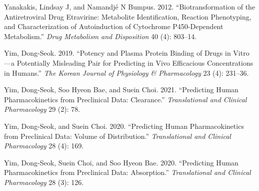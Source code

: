 \documentclass[
  11pt,
  krantz2, a4paper, twoside]{krantz}
\newlength{\cslhangindent}
\newlength{\cslentryspacingunit} %
\newenvironment{CSLReferences}[2] %
 {%
  \setlength{\parindent}{0pt}
  \ifodd #1
  \let\oldpar\par
  \def\par{\hangindent=\cslhangindent\oldpar}
  \fi
  \setlength{\parskip}{#2\cslentryspacingunit}
 }%
 {}
\begin{document}
\begin{CSLReferences}{1}{0}
\leavevmode{}%
Yanakakis, Lindsay J, and Namandjé N Bumpus. 2012. {``Biotransformation of the Antiretroviral Drug Etravirine: Metabolite Identification, Reaction Phenotyping, and Characterization of Autoinduction of Cytochrome P450-Dependent Metabolism.''} \emph{Drug Metabolism and Disposition} 40 (4): 803--14.

\leavevmode{}%
Yim, Dong-Seok. 2019. {``Potency and Plasma Protein Binding of Drugs in Vitro---a Potentially Misleading Pair for Predicting in Vivo Efficacious Concentrations in Humans.''} \emph{The Korean Journal of Physiology \& Pharmacology} 23 (4): 231--36.

\leavevmode{}%
Yim, Dong-Seok, Soo Hyeon Bae, and Suein Choi. 2021. {``Predicting Human Pharmacokinetics from Preclinical Data: Clearance.''} \emph{Translational and Clinical Pharmacology} 29 (2): 78.

\leavevmode{}%
Yim, Dong-Seok, and Suein Choi. 2020. {``Predicting Human Pharmacokinetics from Preclinical Data: Volume of Distribution.''} \emph{Translational and Clinical Pharmacology} 28 (4): 169.

\leavevmode{}%
Yim, Dong-Seok, Suein Choi, and Soo Hyeon Bae. 2020. {``Predicting Human Pharmacokinetics from Preclinical Data: Absorption.''} \emph{Translational and Clinical Pharmacology} 28 (3): 126.

\end{CSLReferences}

\printindex
\end{document}
